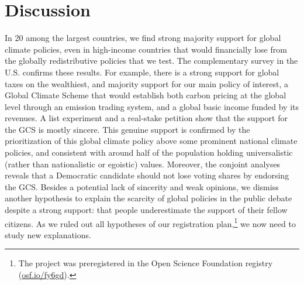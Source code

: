 \section{Discussion} %
In 20 among the largest countries, we find strong majority support for global climate policies, even in high-income countries that would financially lose from the globally redistributive policies that we test. The complementary survey in the U.S. confirms these results. For example, there is a strong support for global taxes on the wealthiest, and majority support for our main policy of interest, a Global Climate Scheme that would establish both carbon pricing at the global level through an emission trading system, and a global basic income funded by its revenues. A list experiment and a real-stake petition show that the support for the GCS is mostly sincere. This genuine support is confirmed by the prioritization of this global climate policy above some prominent national climate policies, and consistent with around half of the population holding universalistic (rather than nationalistic or egoistic) values. Moreover, the conjoint analyses reveals that a Democratic candidate should not lose voting shares by endorsing the GCS. %
Besides a potential lack of sincerity and weak opinions, we dismiss another hypothesis to explain the scarcity of global policies in the public debate despite a strong support: that people underestimate the support of their fellow citizens. As we ruled out all hypotheses of our registration plan,\footnote{The project was preregistered in the Open Science Foundation registry (\href{https://osf.io/fy6gd}{osf.io/fy6gd}).} we now need to study new explanations. %

